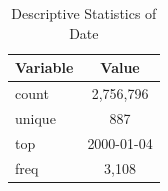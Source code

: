\documentclass{article}
\begin{document}
\begin{itemize}
            \begin{table}[htbp]
            \centering
            \label{tab:date_statistics}
            \begin{tabular}{|l|c|}
            \hline
            \textbf{Variable} & \textbf{Value} \\ \hline
            count & 2,756,796 \\
            unique & 887 \\
            top & 2000-01-04 \\
            freq & 3,108 \\ \hline
            \end{tabular}
            \caption{Descriptive Statistics of Date}
            \end{table}
            \FloatBarrier



\end{itemize}
\end{document}
